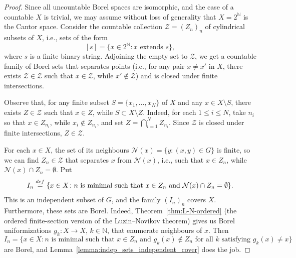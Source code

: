 \documentclass[10pt,a4paper]{amsart}
\newcommand{\bN}{\mathbb N}
\newcommand{\cZ}{\mathcal Z}
\begin{document}
\begin{proof}
  Since all uncountable Borel spaces are isomorphic, and the case of a countable \(X\) is trivial,
  we may assume without loss of generality that \(X = 2^{\bN}\) is the Cantor space.  Consider the
  countable collection $\mathscr Z = (Z_n)_n$ of cylindrical subsets of \(X\), i.e., sets of the
  form
  \[[s] = \{x \in 2^{\bN}\colon  x \text{ extends } s\},\]
  where \(s\) is a finite binary string.  Adjoining the empty set to \(\mathscr Z\), we get a
  countable family of Borel sets that separates points (i.e., for any pair $x\ne x'$ in $X$, there
  exists $\cZ\in\mathscr Z$ such that $x\in \cZ$, while $x'\notin \cZ$) and is closed under finite
  intersections.

  Observe that, for any finite subset $S=\{x_1, \ldots , x_N\}$ of $X$ and any $x\in X\setminus S$,
  there exists $Z\in \mathscr Z$ such that $x\in Z$, while $S\subset X\setminus Z$.  Indeed, for
  each $1\le i \le N$, take $n_i$ so that $x\in Z_{n_i}$, while $x_i\notin Z_{n_i}$, and set
  $Z = \bigcap_{i=1}^N Z_{n_i}$. Since $\mathscr Z$ is closed under finite intersections,
  $Z\in\mathscr Z$.

  For each $x\in X$, the set of its neighbours $\mathcal N(x)=\{y\colon (x, y)\in G\}$ is finite, so we can
  find $Z_n\in\mathscr Z$ that separates $x$ from $\mathcal N(x)$, i.e., such that $x\in Z_n$, while
  $\mathcal N(x)\cap Z_n = \emptyset$. Put
  \[
  I_{n} \stackrel{\rm def}= \{x \in X\colon
n \text{ is minimal such that } x \in Z_{n} \text{ and } \mathcal N(x)\cap Z_n = \emptyset\}.
  \]
  This is an independent subset of $G$, and the family \((I_{n})_{n}\) covers \(X\).  Furthermore,
  these sets are Borel.  Indeed, Theorem~\ref{thm:L-N-ordered} (the ordered finite-section version of
the Luzin--Novikov theorem) gives us Borel uniformizations
  \(g_{k}\colon  X \to X\), \(k \in \bN\), that enumerate neighbours of \(x\). Then
  \[  I_{n} = \{x \in X\colon n \text{ is minimal such that } x \in Z_{n} \text{ and }
    g_{k}(x) \not \in Z_{n} \text{ for all }k \text{ satisfying } g_{k}(x) \ne x\}\]
are Borel, and
Lemma~\ref{lemma:indep_sets_independent_cover} does the job.
\end{proof}
\end{document}
